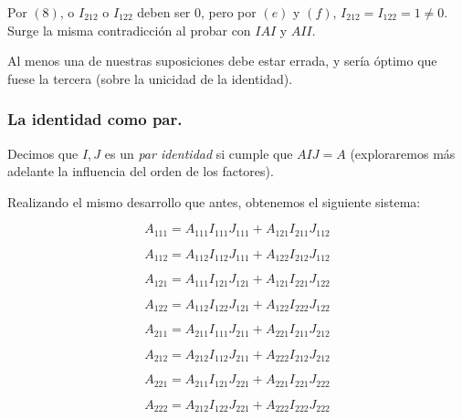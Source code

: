 \documentclass[a4paper, titlepage]{article}
\begin{document}
Por $(8)$, o $I_{212}$ o $I_{122}$ deben ser $0$, pero por $(e)$ y $(f)$, $I_{212} = I_{122} = 1 \neq 0$. Surge la misma contradicción al probar con $IAI$ y $AII$.

Al menos una de nuestras suposiciones debe estar errada, y sería óptimo que fuese la tercera (sobre la unicidad de la identidad).

\subsubsection{La identidad como par.}

Decimos que $I, J$ es un \textit{par identidad} si cumple que $AIJ = A$ (exploraremos más adelante la influencia del orden de los factores).

Realizando el mismo desarrollo que antes, obtenemos el siguiente sistema:

\begin{equation}
A_{111} = A_{111} I_{111} J_{111} + A_{121} I_{211} J_{112}
\end{equation}

\begin{equation}
A_{112} = A_{112} I_{112} J_{111} + A_{122} I_{212} J_{112}
\end{equation}

\begin{equation}
A_{121} = A_{111} I_{121} J_{121} + A_{121} I_{221} J_{122}
\end{equation}

\begin{equation}
A_{122} = A_{112} I_{122} J_{121} + A_{122} I_{222} J_{122}
\end{equation}

\begin{equation}
A_{211} = A_{211} I_{111} J_{211} + A_{221} I_{211} J_{212}
\end{equation}

\begin{equation}
A_{212} = A_{212} I_{112} J_{211} + A_{222} I_{212} J_{212}
\end{equation}

\begin{equation}
A_{221} = A_{211} I_{121} J_{221} + A_{221} I_{221} J_{222}
\end{equation}

\begin{equation}
A_{222} = A_{212} I_{122} J_{221} + A_{222} I_{222} J_{222}
\end{equation}
\end{document}

